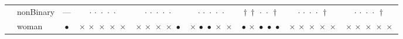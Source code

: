 {\begin{longtable}[t]{llccccccc}
 & nonBinary & --- & ${\cdot}\,{\cdot}\,{\cdot}\,{\cdot}\,{\cdot}$ & ${\cdot}\,{\cdot}\,{\cdot}\,{\cdot}\,{\cdot}$ & ${\cdot}\,{\cdot}\,{\cdot}\,{\cdot}\,{\cdot}$ & ${\dagger}\,{\dagger}\,{\cdot}\,{\cdot}\,{\dagger}$ & ${\cdot}\,{\cdot}\,{\cdot}\,{\cdot}\,{\dagger}$ & ${\cdot}\,{\cdot}\,{\cdot}\,{\cdot}\,{\dagger}$ \\
 & woman & $\bullet$ & ${\times}\,{\times}\,{\times}\,{\times}\,{\times}$ & ${\times}\,{\times}\,{\times}\,{\times}\,{\bullet}$ & ${\times}\,{\bullet}\,{\bullet}\,{\times}\,{\times}$ & ${\bullet}\,{\times}\,{\bullet}\,{\bullet}\,{\bullet}$ & ${\times}\,{\times}\,{\times}\,{\times}\,{\times}$ & ${\times}\,{\times}\,{\times}\,{\times}\,{\times}$ \\
\cline{1-9}
\end{longtable}
}
